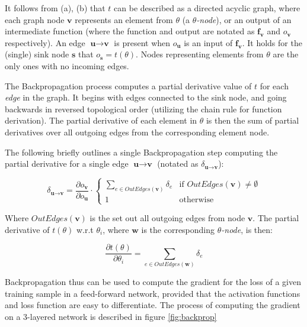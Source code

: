 It follows from (a), (b) that $t$ can be described as a directed acyclic graph, where each graph node $\textbf{v}$ represents an element from $\theta$ (a \textit{$\theta$-node}), or an output of an intermediate function (where the function and output are notated as $\textbf{f}_{\textbf{v}}$ and $o_{\textbf{v}}$ respectively). An edge $\textbf{u}\rightarrow\textbf{v}$ is present when $o_{\textbf{u}}$ is an input of $\textbf{f}_\textbf{v}$. It holds for the (single) sink node $\textbf{s}$ that $o_{\textbf{s}} = t(\theta)$. Nodes representing elements from $\theta$  are the only ones with no incoming edges. 

The Backpropagation process computes a partial derivative value of $t$ for each \emph{edge} in the graph. It begins with edges connected to the sink node, and going backwards in reversed topological order (utilizing the chain rule for function derivation). The partial derivative of each element in $\theta$ is then the sum of partial derivatives over all outgoing edges from the corresponding element node.

The following briefly outlines a single Backpropagation step computing the partial derivative for a single edge $\textbf{u}\rightarrow\textbf{v}$ (notated as $\delta_{\textbf{u}\rightarrow\textbf{v}}$):   

\begin{equation}
    \delta_{\textbf{u}\rightarrow\textbf{v}} = \frac{\partial o_{\textbf{v}}}{\partial o_{\textbf{u}}} \cdot
    \begin{cases}
     \sum\limits_{e \in OutEdges(\textbf{v})} \delta_{e}     & \text{if $OutEdges(\textbf{v}) \neq \emptyset$}\\
    1       & \text{otherwise}
    \end{cases}
    \label{backprop}
\end{equation}

Where $OutEdges(\textbf{v})$ is the set out all outgoing edges from node $\textbf{v}$. The partial derivative of $t(\theta)$ w.r.t $\theta_i$,  where $\textbf{w}$ is the corresponding $\theta$\textit{-node}, is then:

$$\frac{\partial t(\theta)}{\partial \theta_i} = \sum\limits_{e \in OutEdges(\textbf{w})} \delta_{e} $$ 

Backpropagation thus can be used to compute the gradient for the loss of a given training sample in a feed-forward network, provided that the activation functions and loss function are easy to differentiate. The process of computing the gradient on a 3-layered network is described in figure \ref{fig:backprop}

